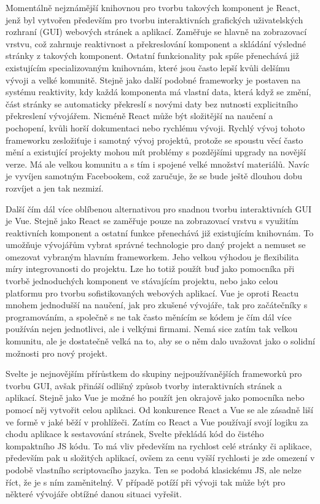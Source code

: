 \begin{itemize}
\begin{itemize}
		Momentálně nejznámější knihovnou pro tvorbu takových komponent je React, jenž
		byl vytvořen především pro tvorbu interaktivních grafických uživatelských rozhraní (\noindent\Acs{GUI}) webových stránek a
		aplikací.
		Zaměřuje se hlavně na zobrazovací vrstvu, což zahrnuje reaktivnost a překreslování komponent a skládání
		výsledné stránky z takových komponent.
		Ostatní funkcionality pak spíše přenechává již existujícím specializovaným knihovnám, které jsou
		často lepší kvůli delšímu vývoji a velké komunitě.
		Stejně jako další podobné frameworky je postaven na systému reaktivity, kdy každá komponenta má vlastní data,
		která když se změní, část stránky se automaticky překreslí s novými daty bez nutnosti explicitního překreslení
		vývojářem.
		Nicméně React může být složitější na naučení a pochopení, kvůli horší dokumentaci nebo rychlému vývoji.
		Rychlý vývoj tohoto frameworku zesložiťuje i samotný vývoj projektů, protože se spoustu věcí často mění a existující
		projekty mohou mít problémy s pozdějšími upgrady na novější verze.
		Má ale velkou komunitu a s tím i spojené velké množství materiálů.
		Navíc je vyvíjen samotným Facebookem, což zaručuje, že se bude ještě dlouhou dobu rozvíjet a jen tak
		nezmizí. \cite{react}

		Další čím dál více oblíbenou alternativou pro snadnou tvorbu interaktivních \Ac{GUI} je Vue.
		Stejně jako React se zaměřuje pouze na zobrazovací vrstvu s využitím reaktivních komponent a ostatní
		funkce přenechává již existujícím knihovnám.
		To umožňuje vývojářům vybrat správné technologie pro daný projekt a nemuset se omezovat vybraným hlavním frameworkem.
		Jeho velkou výhodou je flexibilita míry integrovanosti do projektu.
		Lze ho totiž použít buď jako pomocníka při tvorbě jednoduchých komponent ve stávajícím projektu, nebo jako
		celou platformu pro tvorbu sofistikovaných webových aplikací. \cite{vue_guide}
		Vue je oproti Reactu mnohem jednodušší na naučení, jak pro zkušené vývojáře, tak pro začátečníky
		s programováním, a společně s ne tak často měnícím se kódem je čím dál více používán nejen
		jednotlivci, ale i velkými firmami.
		Nemá sice zatím tak velkou komunitu, ale je dostatečně velká na to, aby se o něm dalo uvažovat
		jako o solidní možnosti pro nový projekt. \cite{vue_vs_react}

		Svelte je nejnovějším přírůstkem do skupiny nejpoužívanějších frameworků pro tvorbu \Ac{GUI}, avšak přináší odlišný
		způsob tvorby interaktivních stránek a aplikací.
		Stejně jako Vue je možné ho použít jen okrajově jako pomocníka nebo pomocí něj vytvořit celou aplikaci.
		Od konkurence React a Vue se ale zásadně liší ve formě v jaké běží v prohlížeči.
		Zatím co React a Vue používají svojí logiku za chodu aplikace k sestavování stránek, Svelte překládá kód
		do čistého kompaktního \ac{JS} kódu.
		To má vliv především na rychlost celé stránky či aplikace, především pak u složitých aplikací,
		ovšem za cenu vyšší rychlosti je zde omezení v podobě vlastního scriptovacího jazyka. \cite{svelte_basics}
		Ten se podobá klasickému \ac{JS}, ale nelze říct, že je s ním zaměnitelný.
		V případě potíží při vývoji tak může být pro některé vývojáře obtížné danou situaci vyřešit. \cite{vue_vs_svelte}


\end{itemize}
\end{itemize}
